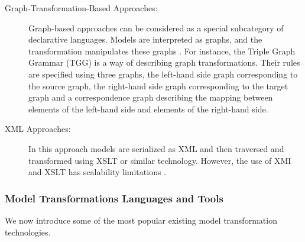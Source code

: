 \begin{description}
\item[Graph-Transformation-Based Approaches:]
Graph-based approaches can be considered as a special subcategory of declarative languages. Models are interpreted as graphs, and the transformation manipulates these graphs \cite{GraphTransformations2006}. For instance, the Triple Graph Grammar (TGG) \cite{GraphTransformations2006} is a way of describing graph transformations. Their rules are specified using three graphs, the left-hand side graph corresponding to the source graph, the right-hand side graph corresponding to the target graph and a correspondence graph describing the mapping between elements of the left-hand side and elements of the right-hand side.

\item[XML Approaches:]
In this approach models are serialized as XML and then traversed and transformed using XSLT or similar technology. However, the use of XMI and XSLT has scalability limitations \cite{peltier2001mtrans}. 
\end{description}

\subsubsection{Model Transformations Languages and Tools}

We now introduce some of the most popular existing model transformation technologies.

